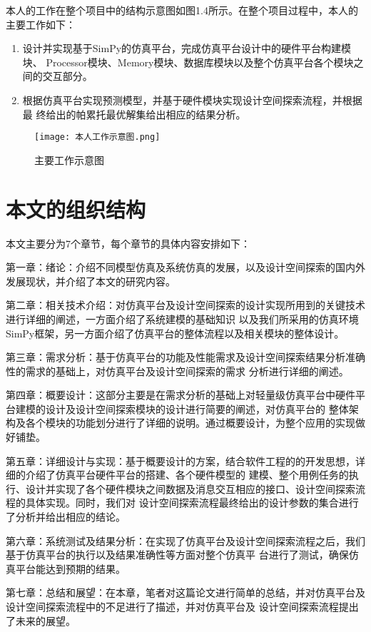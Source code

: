 本人的工作在整个项目中的结构示意图如图1.4所示。在整个项目过程中，本人的主要工作如下：

\begin{enumerate}
    \item 设计并实现基于SimPy的仿真平台，完成仿真平台设计中的硬件平台构建模块、
    Processor模块、Memory模块、数据库模块以及整个仿真平台各个模块之间的交互部分。
    \item 根据仿真平台实现预测模型，并基于硬件模块实现设计空间探索流程，并根据最
    终给出的帕累托最优解集给出相应的结果分析。
\end{enumerate}

\begin{figure}
    \centering
    \texttt{[image: 本人工作示意图.png]}
    \caption{主要工作示意图}
    \label{fig:badge}
\end{figure}


\section{本文的组织结构}
本文主要分为7个章节，每个章节的具体内容安排如下：

第一章：绪论：介绍不同模型仿真及系统仿真的发展，以及设计空间探索的国内外发展现状，并介绍了本文的研究内容。

第二章：相关技术介绍：对仿真平台及设计空间探索的设计实现所用到的关键技术进行详细的阐述，一方面介绍了系统建模的基础知识
以及我们所采用的仿真环境SimPy框架，另一方面介绍了仿真平台的整体流程以及相关模块的整体设计。

第三章：需求分析：基于仿真平台的功能及性能需求及设计空间探索结果分析准确性的需求的基础上，对仿真平台及设计空间探索的需求
分析进行详细的阐述。

第四章：概要设计：这部分主要是在需求分析的基础上对轻量级仿真平台中硬件平台建模的设计及设计空间探索模块的设计进行简要的阐述，对仿真平台的
整体架构及各个模块的功能划分进行了详细的说明。通过概要设计，为整个应用的实现做好铺垫。

第五章：详细设计与实现：基于概要设计的方案，结合软件工程的的开发思想，详细的介绍了仿真平台硬件平台的搭建、各个硬件模型的
建模、整个用例任务的执行、设计并实现了各个硬件模块之间数据及消息交互相应的接口、设计空间探索流程的具体实现。同时，我们对
设计空间探索流程最终给出的设计参数的集合进行了分析并给出相应的结论。

第六章：系统测试及结果分析：在实现了仿真平台及设计空间探索流程之后，我们基于仿真平台的执行以及结果准确性等方面对整个仿真平
台进行了测试，确保仿真平台能达到预期的结果。

第七章：总结和展望：在本章，笔者对这篇论文进行简单的总结，并对仿真平台及设计空间探索流程中的不足进行了描述，并对仿真平台及
设计空间探索流程提出了未来的展望。

